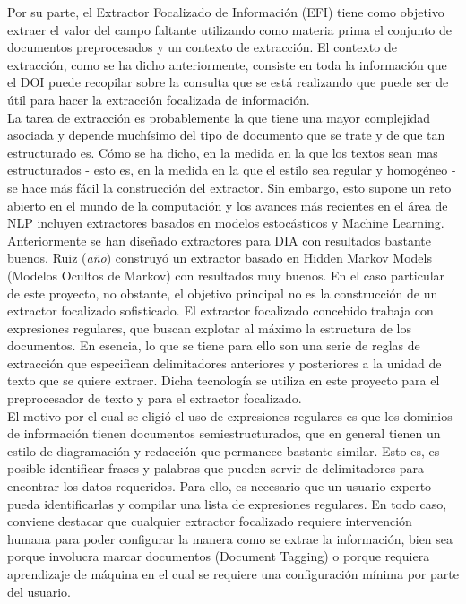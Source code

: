 Por su parte, el Extractor Focalizado de Información (EFI) tiene como objetivo extraer el valor del campo faltante utilizando como materia prima el conjunto de documentos preprocesados y un contexto de extracción. El contexto de extracción, como se ha dicho anteriormente, consiste en toda la información que el DOI puede recopilar sobre la consulta que se está realizando que puede ser de útil para hacer la extracción focalizada de información. \\

La tarea de extracción es probablemente la que tiene una mayor complejidad asociada y depende muchísimo del tipo de documento que se trate y de que tan estructurado es. Cómo se ha dicho, en la medida en la que los textos sean mas estructurados - esto es, en la medida en la que el estilo sea regular y homogéneo - se hace más fácil la construcción del extractor. Sin embargo, esto supone un reto abierto en el mundo de la computación y los avances más recientes en el área de NLP incluyen extractores basados en modelos estocásticos y Machine Learning. \\

Anteriormente se han diseñado extractores para DIA con resultados bastante buenos. Ruiz (\emph{año}) \cite{ruiz-HMM} construyó un extractor basado en Hidden Markov Models (Modelos Ocultos de Markov) con resultados muy buenos. En el caso particular de este proyecto, no obstante, el objetivo principal no es la construcción de un extractor focalizado sofisticado. El extractor focalizado concebido trabaja con expresiones regulares, que buscan explotar al máximo la estructura de los documentos. En esencia, lo que se tiene para ello son una serie de reglas de extracción que especifican delimitadores anteriores y posteriores a la unidad de texto que se quiere extraer. Dicha tecnología se utiliza en este proyecto para el preprocesador de texto y para el extractor focalizado.\\

El motivo por el cual se eligió el uso de expresiones regulares es que los dominios de información tienen documentos semiestructurados,  que en general tienen un estilo de diagramación y redacción que permanece bastante similar. Esto es, es posible identificar frases y palabras que pueden servir de delimitadores para encontrar los datos requeridos. Para ello, es necesario que un usuario experto pueda identificarlas y compilar una lista de expresiones regulares. En todo caso, conviene destacar que cualquier extractor focalizado requiere intervención humana para poder configurar la manera como se extrae la información, bien sea porque involucra marcar documentos (Document Tagging) o porque requiera aprendizaje de máquina en el cual se requiere una configuración mínima por parte del usuario.\\

